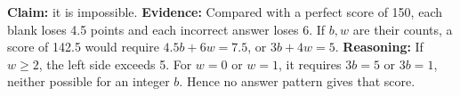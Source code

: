 \textbf{Claim:} it is impossible. \textbf{Evidence:} Compared with a perfect score of 150, each blank loses 4.5 points and each incorrect answer loses 6. If $b,w$ are their counts, a score of 142.5 would require $4.5b+6w=7.5$, or $3b+4w=5$. \textbf{Reasoning:} If $w\ge2$, the left side exceeds 5. For $w=0$ or $w=1$, it requires $3b=5$ or $3b=1$, neither possible for an integer $b$. Hence no answer pattern gives that score.
